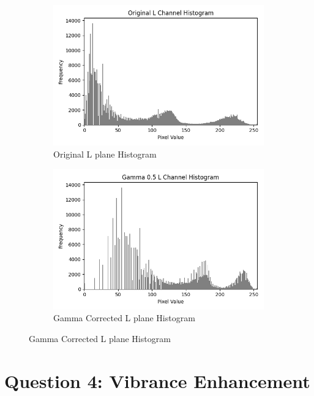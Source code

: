 \documentclass[11pt]{article}
\begin{document}
\begin{figure}[H]
    \centering
    \begin{subfigure}{0.42\textwidth}
        \includegraphics[width=\textwidth]{resources/gamma_original_histogram.png}
        \caption{Original L plane Histogram}
    \end{subfigure}
    \hfill
    \begin{subfigure}{0.42\textwidth}
        \includegraphics[width=\textwidth]{resources/gamma_0.5_histogram.png}
        \caption{Gamma Corrected L plane Histogram}
    \end{subfigure}
\end{figure}

\section*{Question 4: Vibrance Enhancement}
\end{document}
